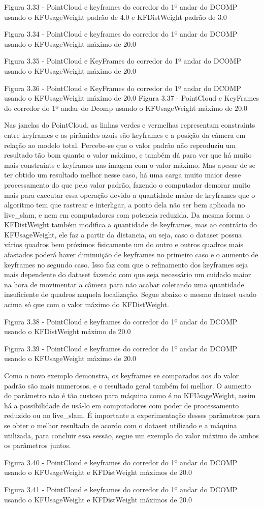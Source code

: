 Figura 3.33 - PointCloud e keyframes do corredor do 1º andar do DCOMP usando o KFUsageWeight padrão de 4.0 e KFDistWeight padrão de 3.0

Figura 3.34 - PointCloud e keyframes do corredor do 1º andar do DCOMP usando o KFUsageWeight máximo de 20.0

Figura 3.35 - PointCloud e KeyFrames do corredor do 1º andar do DCOMP usando o KFUsageWeight máximo de 20.0

Figura 3.36 - PointCloud e KeyFrames do corredor do 1º andar do DCOMP usando o KFUsageWeight máximo de 20.0
Figura 3.37 - PointCloud e KeyFrames do corredor do 1º andar do Dcomp usando o KFUsageWeight máximo de 20.0

Nas janelas do PointCloud, as linhas verdes e vermelhas representam constraints entre keyframes e as pirâmides azuis são keyframes e a posição da câmera em relação ao modelo total. Percebe-se que o valor padrão não reproduziu um resultado tão bom quanto o valor máximo, e também dá para ver que há muito mais constraints e keyframes nas imagem com o valor máximo. Mas apesar de se ter obtido um resultado melhor nesse caso, há uma carga muito maior desse processamento do que pelo valor padrão, fazendo o computador demorar muito mais para executar essa operação devido a quantidade maior de keyframes que o algoritmo tem que rastrear e interligar, a ponto dela não ser bem aplicada no live\_slam, e nem em computadores com potencia reduzida. Da mesma forma o KFDistWeight também modifica a quantidade de keyframes, mas ao contrário do KFUsageWeight, ele faz a partir da distancia, ou seja, caso o dataset possua vários quadros bem próximos fisicamente um do outro e outros quadros mais afastados poderá haver diminuição de keyframes no primeiro caso e o aumento de keyframes no segundo caso. Isso faz com que o refinamento dos keyframes seja mais dependente do dataset fazendo com que seja necessário um cuidado maior na hora de movimentar a câmera para não acabar coletando uma quantidade insuficiente de quadros naquela localização. Segue abaixo o mesmo dataset usado acima só que com o valor máximo do KFDistWeight.

Figura 3.38 - PointCloud e keyframes do corredor do 1º andar do DCOMP usando o KFDistWeight máximo de 20.0

Figura 3.39 - PointCloud e keyframes do corredor do 1º andar do DCOMP usando o KFUsageWeight máximo de 20.0

Como o novo exemplo demonstra, os keyframes se comparados aos do valor padrão são mais numerosos, e o resultado geral também foi melhor. O aumento do parâmetro não é tão custoso para máquina como é no KFUsageWeight, assim  há a possibilidade de usá-lo em computadores com poder de processamento reduzido ou no live\_slam. É importante a experimentação desses parâmetros para se obter o melhor resultado de acordo com o dataset utilizado e a máquina utilizada, para concluir essa sessão, segue um exemplo do valor máximo de ambos os parâmetros juntos.

Figura 3.40 - PointCloud e keyframes do corredor do 1º andar do DCOMP usando o KFUsageWeight e KFDistWeight máximos de 20.0

Figura 3.41 - PointCloud e keyframes do corredor do 1º andar do DCOMP usando o KFUsageWeight e KFDistWeight máximos de 20.0

